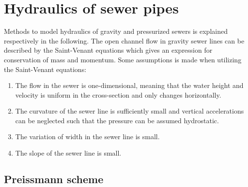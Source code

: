 \section{Hydraulics of sewer pipes}\label{se:hydraulics_of_sewer_pipes}

Methods to model hydraulics of gravity and pressurized sewers is explained respectively in the following. The open channel flow in gravity sewer lines can be described by the Saint-Venant equations which gives an expression for conservation of mass and momentum.
Some assumptions is made when utilizing the Saint-Venant equations:

\begin{enumerate}

\item The flow in the sewer is one-dimensional, meaning that the water height and velocity is uniform in the cross-section and only changes horizontally.
\item The curvature of the sewer line is sufficiently small and vertical accelerations can be neglected such that the pressure can be assumed hydrostatic.
\item The variation of width in the sewer line is small.
\item The slope of the sewer line is small. 

\end{enumerate}

\subsection{Preissmann scheme}\label{subse:preissmann_scheme}



